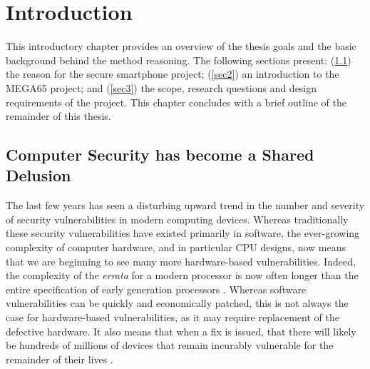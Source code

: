 
\chapter{Introduction} %

\label{Chapter1} %


This introductory chapter provides an overview of the thesis goals and the basic background behind the method reasoning. 
The following sections present: (\ref{sec1}) the reason for the secure smartphone project; (\ref{sec2}) an introduction to the MEGA65 project; and (\ref{sec3}) the scope, research questions and design requirements of the project. 
This chapter concludes with a brief outline of the remainder of this thesis.

\section{Computer Security has become a Shared Delusion}
\label{sec1}

The last few years has seen a disturbing upward trend in the number and severity of security vulnerabilities in modern computing devices.
Whereas traditionally these security vulnerabilities have existed primarily in software, the ever-growing complexity of computer hardware, and in particular CPU designs, now means that we are beginning to see many more hardware-based vulnerabilities.
Indeed, the complexity of the {\em errata} for a modern processor is now often longer\cite{6thGener70:online} than the entire specification of early generation processors \cite{mos6500m32:online}.
Whereas software vulnerabilities can be quickly and economically patched, this is not always the case for hardware-based vulnerabilities, as it may require replacement of the defective hardware\cite{WillHuge39:online}.  
It also means that when a fix is issued, that there will likely be hundreds of millions of devices that remain incurably vulnerable for the remainder of their lives \cite{Intellef1:online}.

